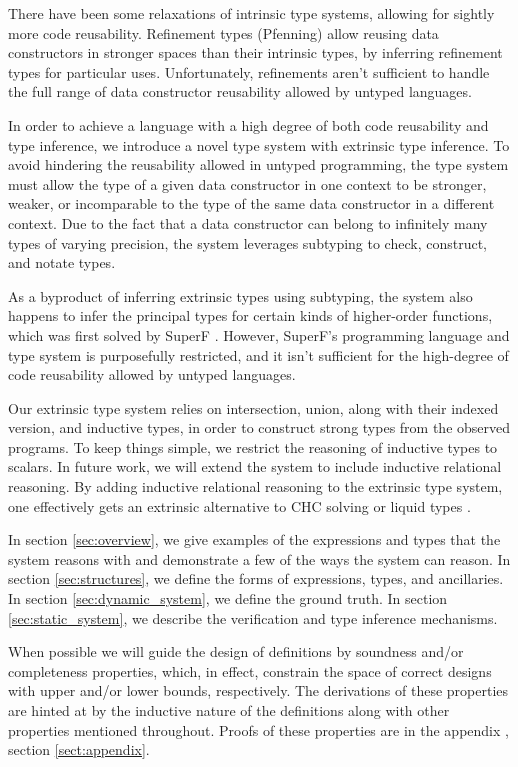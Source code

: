 \documentclass[acmsmall]{acmart}
\theoremstyle{definition}
\begin{document}
There have been some relaxations of intrinsic type systems, allowing for sightly more code reusability.
Refinement types (Pfenning) \cite{} allow reusing data constructors in stronger spaces than their intrinsic types, by
inferring refinement types for particular uses.
Unfortunately, refinements aren't sufficient to handle the full range of data constructor reusability allowed by untyped languages.

In order to achieve a language with a high degree of both code reusability and type inference, 
we introduce a novel type system with extrinsic type inference. 
To avoid hindering the reusability allowed in untyped programming, 
the type system must allow the type of a given data constructor in one context
to be stronger, weaker, or incomparable to the type of 
the same data constructor in a different context. 
Due to the fact that a data constructor can belong to infinitely many types of varying precision,
the system leverages subtyping to check, construct, and notate types.

As a byproduct of inferring extrinsic types using subtyping, the system also happens to infer the principal types for 
certain kinds of higher-order functions, which was first solved by SuperF \cite{}. 
However, SuperF's programming language and type system is purposefully 
restricted, and it isn't sufficient for the high-degree of code reusability allowed by untyped languages.

Our extrinsic type system relies on intersection, union, along with their indexed version, and inductive types, in order 
to construct strong types from the observed programs. 
To keep things simple, we restrict the reasoning of inductive types to scalars. In future work, 
we will extend the system to include inductive relational reasoning. By adding inductive relational
reasoning to the extrinsic type system, one effectively gets an extrinsic alternative to CHC solving \cite{} 
or liquid types \cite{}.


In section \ref{sec:overview}, we give examples of the expressions and types that the system reasons with
and demonstrate a few of the ways the system can reason. 
In section \ref{sec:structures}, we define the forms of expressions, types, and ancillaries. 
In section \ref{sec:dynamic_system}, we define the ground truth.
In section \ref{sec:static_system}, we describe the verification and type inference mechanisms.

When possible we will guide the design of definitions by soundness and/or completeness properties,
which, in effect, constrain the space of correct designs with upper and/or lower bounds, respectively. 
The derivations of these properties are hinted at by the inductive nature of the definitions 
along with other properties mentioned throughout.
Proofs of these properties are in the appendix , section \ref{sect:appendix}.
\end{document}
